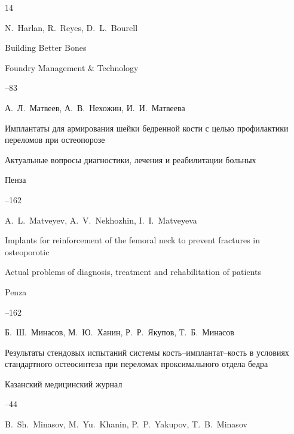 \begin{thebibliography}{14}






\by N.~Harlan, R.~Reyes, D.~L.~Bourell

\paper Building Better Bones

\jour Foundry Management \& Technology



--83







\by А.~Л.~Матвеев, А.~В.~Нехожин, И.~И.~Матвеева

\paper Имплантаты для армирования шейки бедренной кости с целью профилактики переломов при остеопорозе

\inbook Актуальные вопросы диагностики, лечения  и реабилитации больных

\publaddr Пенза


--162

\misctransl

\by A.~L.~Matveyev, A.~V.~Nekhozhin, I.~I.~Matveyeva 

\paper Implants for reinforcement of the femoral neck to prevent fractures in osteoporotic

\inbook Actual problems of diagnosis, treatment and rehabilitation of patients

\publaddr Penza 


--162






\by Б.~Ш.~Минасов, М.~Ю.~Ханин, Р.~Р.~Якупов, Т.~Б.~Минасов

\paper Результаты стендовых испытаний системы кость--имплантат--кость в условиях стандартного остеосинтеза при переломах проксимального отдела бедра

\jour Казанский медицинский журнал



--44

\misctransl

\by B.~Sh.~Minasov, M.~Yu.~Khanin, P.~P.~Yakupov, T.~B.~Minasov


\end{thebibliography}
